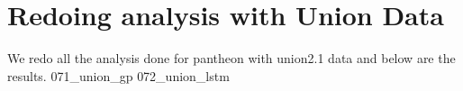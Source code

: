 \section{Redoing analysis with Union Data}
We redo all the analysis done for pantheon with union2.1 data and below are the results.
{071_union_gp}
{072_union_lstm}